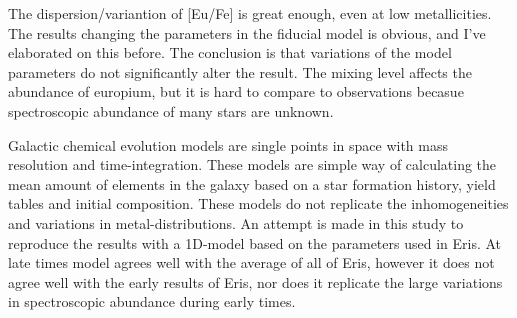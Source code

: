 The dispersion/variantion of [Eu/Fe] is great enough, even at low metallicities.
The results changing the parameters in the fiducial model is obvious, and I've elaborated on this before.
The conclusion is that variations of the model parameters do not significantly alter the result.
The mixing level affects the abundance of europium, but it is hard to compare to observations becasue spectroscopic abundance of many stars are unknown.

Galactic chemical evolution models are single points in space with mass resolution and time-integration. These models are simple way of calculating the mean amount of elements in the galaxy based on a star formation history, yield tables and initial composition.
These models do not replicate the inhomogeneities and variations in metal-distributions.
An attempt is made in this study to reproduce the results with a 1D-model based on the parameters used in Eris.
At late times model agrees well with the average of all of Eris, however it does not agree well with the early results of Eris, nor does it replicate the large variations in spectroscopic abundance during early times.

\fi
